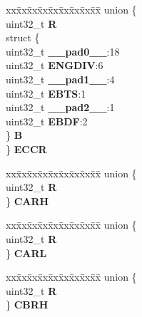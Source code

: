 \begin{DoxyCompactItemize}
\begin{tabbing}
\end{tabbing}\item 
\mbox{\label{structSIU__tag_ae4e5b54af2be9632f64fa99465fe84ce}} 
\begin{tabbing}
xx\=xx\=xx\=xx\=xx\=xx\=xx\=xx\=xx\=\kill
union \{\\
\>uint32\_t {\bfseries R}\\
\>struct \{\\
\>\>uint32\_t {\bfseries \_\_pad0\_\_}:18\\
\>\>uint32\_t {\bfseries ENGDIV}:6\\
\>\>uint32\_t {\bfseries \_\_pad1\_\_}:4\\
\>\>uint32\_t {\bfseries EBTS}:1\\
\>\>uint32\_t {\bfseries \_\_pad2\_\_}:1\\
\>\>uint32\_t {\bfseries EBDF}:2\\
\>\} {\bfseries B}\\
\} {\bfseries ECCR}\\

\end{tabbing}\item 
\mbox{\label{structSIU__tag_a9a0b0f3e52d656313e56d6c795f46e1a}} 
\begin{tabbing}
xx\=xx\=xx\=xx\=xx\=xx\=xx\=xx\=xx\=\kill
union \{\\
\>uint32\_t {\bfseries R}\\
\} {\bfseries CARH}\\

\end{tabbing}\item 
\mbox{\label{structSIU__tag_a5dc88aa0dda52348b0857369f38b874b}} 
\begin{tabbing}
xx\=xx\=xx\=xx\=xx\=xx\=xx\=xx\=xx\=\kill
union \{\\
\>uint32\_t {\bfseries R}\\
\} {\bfseries CARL}\\

\end{tabbing}\item 
\mbox{\label{structSIU__tag_a4e780ef50c1f7ab2e8789125d45c1224}} 
\begin{tabbing}
xx\=xx\=xx\=xx\=xx\=xx\=xx\=xx\=xx\=\kill
union \{\\
\>uint32\_t {\bfseries R}\\
\} {\bfseries CBRH}\\


\end{tabbing}
\end{DoxyCompactItemize}

